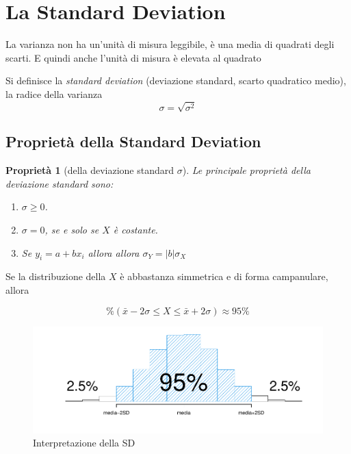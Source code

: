 \documentclass[
  11pt,
]{book}
\providecommand{\tightlist}{%
  \setlength{\itemsep}{0pt}\setlength{\parskip}{0pt}}
\theoremstyle{mytheoremstyle}
\newtheorem{proposition}{Proprietà}[section]
\theoremstyle{mydefstyle}
\begin{document}
\section{La Standard Deviation}\label{sd}

La varianza non ha un'unità di misura leggibile, è una media di quadrati degli scarti. E quindi anche l'unità di misura è elevata al quadrato

Si definisce la \emph{standard deviation} (deviazione standard, scarto quadratico medio), la radice della varianza
\[
\sigma=\sqrt{\sigma^2}
\]

\subsection{Proprietà della Standard Deviation}\label{proprietuxe0-della-standard-deviation}

\begin{info}

\begin{proposition}[della deviazione standard $\sigma$]

Le principale proprietà della deviazione standard sono:

\begin{enumerate}
\def\labelenumi{\arabic{enumi}.}
\tightlist
\item
  \(\sigma\ge 0\).
\item
  \(\sigma=0\), se e solo se \(X\) è costante.
\item
  Se \(y_i=a+bx_i\) allora allora \(\sigma_Y = |b|\sigma_X\)
\end{enumerate}

\end{proposition}

\end{info}

Se la distribuzione della \(X\) è abbastanza simmetrica e di forma campanulare, allora

\[
\%(\bar x-2\sigma\le X\le \bar x+2\sigma)\approx 95\%
\]

\begin{figure}[H]

{\centering \includegraphics{Appunti_di_Statistica_2025_files/figure-latex/sd-1} 

}

\caption{Interpretazione della SD}\label{fig:sd}
\end{figure}
\end{document}
